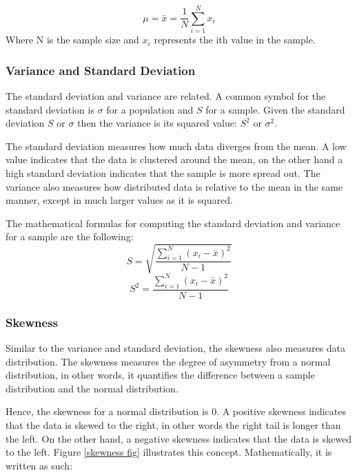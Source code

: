 \begin{equation}
    \mu = \bar{x} = \frac{1}{N}\sum^{N}_{i=1} x_{i}
\end{equation}
Where N is the sample size and $x_{i}$ represents the ith value in the sample.

\subsubsection{Variance and Standard Deviation}

The standard deviation and variance are related. A common symbol for the standard deviation is $\sigma$ for a population and $S$ for a sample. Given the standard deviation $S$ or $\sigma$ then the variance is its squared value: $S^{2}$ or $\sigma^{2}$.

The standard deviation measures how much data diverges from the mean. A low value indicates that the data is clustered around the mean, on the other hand a high standard deviation indicates that the sample is more spread out. The variance also measures how distributed data is relative to the mean in the same manner, except in much larger values as it is squared.

The mathematical formulas for computing the standard deviation and variance for a sample are the following:
\begin{equation}
    S = \sqrt{\frac{\sum_{i=1}^{N}(x_{i} - \bar{x})^{2}}{N - 1}}
\end{equation}
\begin{equation}
    S^2 = \frac{\sum_{i=1}^{N}(x_{i} - \bar{x})^{2}}{N - 1}
\end{equation}

\subsubsection{Skewness}

Similar to the variance and standard deviation, the skewness also measures data distribution. The skewness measures the degree of asymmetry from a normal distribution, in other words, it quantifies the difference between a sample distribution and the normal distribution.

Hence, the skewness for a normal distribution is 0. A positive skewness indicates that the data is skewed to the right, in other words the right tail is longer than the left. On the other hand, a negative skewness indicates that the data is skewed to the left. Figure \ref{skewness fig} illustrates this concept. Mathematically, it is written as such:


